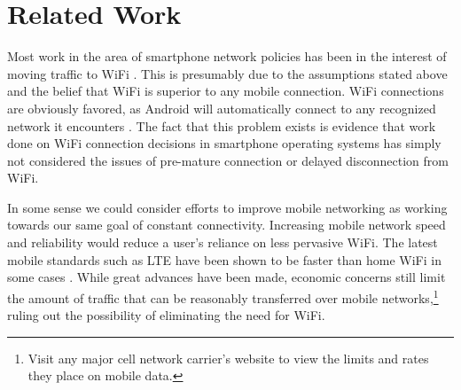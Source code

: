 \section{Related Work}
\label{sec:related}

Most work in the area of smartphone network policies has been in the interest of moving traffic to WiFi \cite{Lee:2010:MDO:1921168.1921203}. This is presumably due to the assumptions stated above and the belief that WiFi is superior to any mobile connection. WiFi connections are obviously favored, as Android will automatically connect to any recognized network it encounters \cite{Google:2013}. The fact that this problem exists is evidence that work done on WiFi connection decisions in smartphone operating systems has simply not considered the issues of pre-mature connection or delayed disconnection from WiFi.

In some sense we could consider efforts to improve mobile networking as working towards our same goal of constant connectivity. Increasing mobile network speed and reliability would reduce a user's reliance on less pervasive WiFi. The latest mobile standards such as LTE have been shown to be faster than home WiFi in some cases \cite{Huang:2012:CEP:2307636.2307658}. While great advances have been made, economic concerns still limit the amount of traffic that can be reasonably transferred over mobile networks,\footnote{Visit any major cell network carrier's website to view the limits and rates they place on mobile data.} ruling out the possibility of eliminating the need for WiFi.
